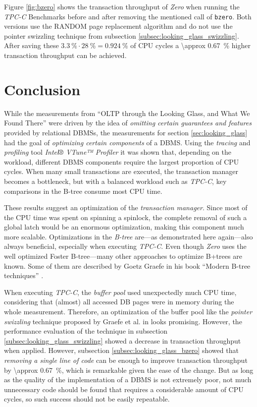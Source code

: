     Figure \ref{fig:bzero} shows the transaction throughput of \textit{Zero} when running the \textit{TPC-C} Benchmarks before and after removing the mentioned call of \lstinline|bzero|. Both versions use the RANDOM page replacement algorithm and do not use the pointer swizzling technique from subsection \ref{subsec:looking_glass_swizzling}. After saving these $\SI{3.3}{\percent} \cdot \SI{28}{\percent} = \SI{0.924}{\percent}$ of CPU cycles a \SI{\approx 0.67}{\percent} higher transaction throughput can be achieved.

\section{Conclusion} \label{sec:looking_glass_outro}

    While the measurements from ``OLTP through the Looking Glass, and What We Found There'' were driven by the idea of \emph{omitting certain guarantees and features} provided by relational DBMSs, the measurements for section \ref{sec:looking_glass} had the goal of \emph{optimizing certain components} of a DBMS. Using the \emph{tracing} and \emph{profiling} tool \textit{Intel® VTune™ Profiler} it was shown that, depending on the workload, different DBMS components require the largest proportion of CPU cycles. When many small transactions are executed, the transaction manager becomes a bottleneck, but with a balanced workload such as \textit{TPC-C}, key comparisons in the B-tree consume most CPU time.

    These results suggest an optimization of the \emph{transaction manager}. Since most of the CPU time was spent on spinning a spinlock, the complete removal of such a global latch would be an enormous optimization, making this component much more scalable. Optimizations in the \emph{B-tree} are---as demonstrated here again---also always beneficial, especially when executing \textit{TPC-C}. Even though \textit{Zero} uses the well optimized Foster B-tree---many other approaches to optimize B+trees are known. Some of them are described by Goetz Graefe in his book ``Modern B-tree techniques'' \cite{Graefe:2011}.

    When executing \textit{TPC-C}, the \emph{buffer pool} used unexpectedly much CPU time, considering that (almost) all accessed DB pages were in memory during the whole measurement. Therefore, an optimization of the buffer pool like the \emph{pointer swizzling} technique proposed by Graefe et al. in \cite{Graefe:2014} looks promising. However, the performance evaluation of the technique in subsection \ref{subsec:looking_glass_swizzling} showed a decrease in transaction throughput when applied. However, subsection \ref{subsec:looking_glass_bzero} showed that \emph{removing a single line of code} can be enough to improve transaction throughput by \SI{\approx 0.67}{\percent}, which is remarkable given the ease of the change. But as long as the quality of the implementation of a DBMS is not extremely poor, not much unnecessary code should be found that requires a considerable amount of CPU cycles, so such success should not be easily repeatable.
